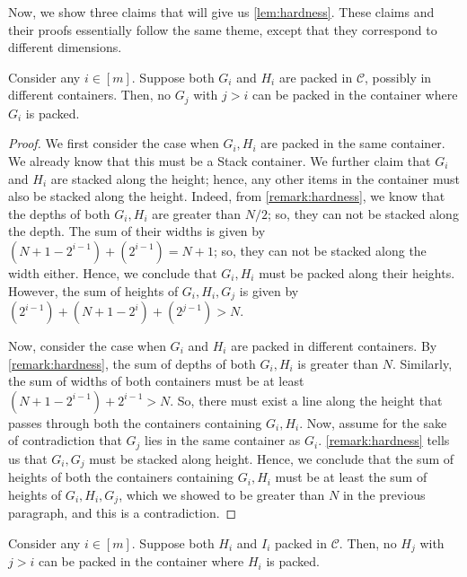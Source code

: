Now, we show three claims that will give us \cref{lem:hardness}. These claims and their proofs essentially follow the same theme, except that they correspond to different dimensions.
\begin{claim}
\label{lem:ghg}
    Consider any $i\in[m]$. Suppose both $G_i$ and $H_i$ are packed in $\mathcal C$, possibly in different containers. Then, no $G_j$ with $j>i$ can be packed in the container where $G_i$ is packed.
\end{claim}
\begin{proof}
    We first consider the case when $G_i,H_i$ are packed in the same container.
    We already know that this must be a Stack container. We further claim that $G_i$ and $H_i$ are stacked along the height; hence, any other items in the container must also be stacked along the height.
    Indeed, from \cref{remark:hardness}, we know that the depths of both $G_i,H_i$ are greater than $N/2$; so, they can not be stacked along the depth. The sum of their widths is given by $(N+1-2^{i-1})+(2^{i-1})=N+1$; so, they can not be stacked along the width either. Hence, we conclude that $G_i,H_i$ must be packed along their heights. However, the sum of heights of $G_i,H_i,G_j$ is given by $(2^{i-1})+(N+1-2^{i})+(2^{j-1})>N$.

    Now, consider the case when $G_i$ and $H_i$ are packed in different containers.
    By \cref{remark:hardness}, the sum of depths of both $G_i,H_i$ is greater than $N$. Similarly, the sum of widths of both containers must be at least $(N+1-2^{i-1})+2^{i-1}>N$.
    So, there must exist a line along the height that passes through both the containers containing $G_i,H_i$.
    Now, assume for the sake of contradiction that $G_j$ lies in the same container as $G_i$. \cref{remark:hardness} tells us that $G_i,G_j$ must be stacked along height.
    Hence, we conclude that the sum of heights of both the containers containing $G_i,H_i$ must be at least the sum of heights of $G_i,H_i,G_j$, which we showed to be greater than $N$ in the previous paragraph,
    and this is a contradiction.
\end{proof}
\begin{claim}
\label{lem:hih}
    Consider any $i\in[m]$. Suppose both $H_i$ and $I_i$ packed in $\mathcal C$. Then, no $H_j$ with $j>i$ can be packed in the container where $H_i$ is packed.
\end{claim}
